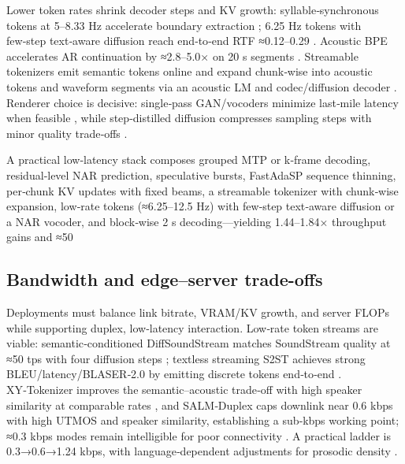 Lower token rates shrink decoder steps and KV growth: syllable‑synchronous tokens at 5–8.33 Hz accelerate boundary extraction \cite{baade2024syllablelmlearningcoarsesemanticunitsspe}; 6.25 Hz tokens with few‑step text‑aware diffusion reach end‑to‑end RTF ≈0.12–0.29 \cite{wang2025tadicodectextawarediffusionspeechtokeniz}. Acoustic BPE accelerates AR continuation by ≈2.8–5.0× on 20 s segments \cite{shen2024acousticbpespeechgenerationdiscretetoken}. Streamable tokenizers emit semantic tokens online and expand chunk‑wise into acoustic tokens and waveform segments via an acoustic LM and codec/diffusion decoder \cite{turetzky2024lastlanguagemodelawarespeechtokenization,bai2025dmelspeechtokenizationmadesimple,yang2025diffsoundstreamefficientspeechtokenizati,vashishth2024stabspeechtokenizerassessmentbenchmark,zhao2024textlessstreamingspeechtranslationsemant}. Renderer choice is decisive: single‑pass GAN/vocoders minimize last‑mile latency when feasible \cite{wang2024evaluatingtextspeechsynthesislargediscre}, while step‑distilled diffusion compresses sampling steps with minor quality trade‑offs \cite{yang2025diffsoundstreamefficientspeechtokenizati}.

A practical low‑latency stack composes grouped MTP or k‑frame decoding, residual‑level NAR prediction, speculative bursts, FastAdaSP sequence thinning, per‑chunk KV updates with fixed beams, a streamable tokenizer with chunk‑wise expansion, low‑rate tokens (≈6.25–12.5 Hz) with few‑step text‑aware diffusion or a NAR vocoder, and block‑wise 2 s decoding—yielding 1.44–1.84× throughput gains and ≈50%

\subsection{Bandwidth and edge–server trade-offs} \label{subsec:Bandwidth and edge–server trade-offs}
Deployments must balance link bitrate, VRAM/KV growth, and server FLOPs while supporting duplex, low‑latency interaction. Low‑rate token streams are viable: semantic‑conditioned DiffSoundStream matches SoundStream quality at ≈50 tps with four diffusion steps \cite{yang2025diffsoundstreamefficientspeechtokenizati}; textless streaming S2ST achieves strong BLEU/latency/BLASER‑2.0 by emitting discrete tokens end‑to‑end \cite{zhao2024textlessstreamingspeechtranslationsemant}. XY‑Tokenizer improves the semantic–acoustic trade‑off with high speaker similarity at comparable rates \cite{gong2025xytokenizermitigatingsemanticacousticcon}, and SALM‑Duplex caps downlink near 0.6 kbps with high UTMOS and speaker similarity, establishing a sub‑kbps working point; ≈0.3 kbps modes remain intelligible for poor connectivity \cite{hu2025salmduplexefficientdirectmodelingspeechl,xue2025hhcodechighcompressionfidelitydiscretene}. A practical ladder is 0.3→0.6→1.24 kbps, with language‑dependent adjustments for prosodic density \cite{onda2025benchmarkingprosodyencodingdiscretespeec,zhang2025impactframeratesspeechtokenizercasestudy}.

